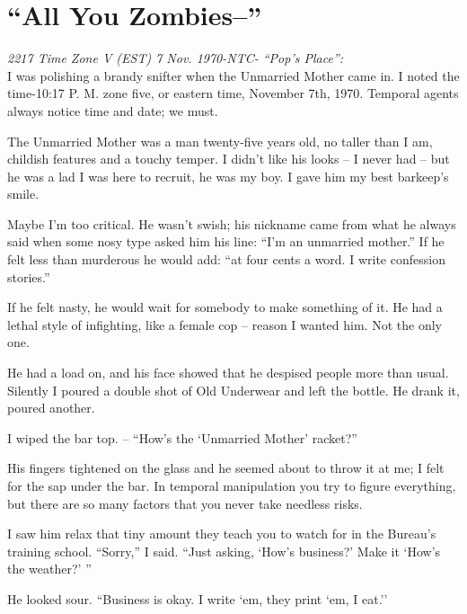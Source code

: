 
\chapter{``All You Zombies--''}

\emph{2217  Time Zone V (EST) 7 Nov. 1970-NTC- ``Pop's Place'':}\\
I was polishing a brandy snifter when the Unmarried Mother came
in. I noted the time-10:17 P. M. zone five, or  eastern  time,
November  7th,  1970.  Temporal  agents  always notice time and
date; we must.

The Unmarried Mother was a man twenty-five  years  old,
no  taller  than I am, childish features and a touchy temper. I
didn't like his looks -- I never had -- but he was a  lad  I  was
here  to  recruit,  he was my boy. I gave him my best barkeep's
smile.

Maybe I'm too critical. He wasn't swish;  his  nickname
came from what he always said when some nosy type asked him his
line:  ``I'm  an  unmarried  mother.''  If  he  felt less than
murderous he  would  add:  ``at  four  cents  a  word.  I  write
confession stories.''

If  he  felt  nasty, he would wait for somebody to make
something of it. He had a lethal style of  infighting,  like  a
female cop -- reason I wanted him. Not the only one.

He  had a load on, and his face showed that he despised
people more than usual. Silently I poured a double shot of  Old
Underwear and left the bottle. He drank it, poured another.

I  wiped  the  bar top. -- ``How's the `Unmarried Mother' racket?''

His fingers tightened on the glass and he seemed  about
to  throw  it  at  me;  I  felt  for  the sap under the bar. In
temporal manipulation you try to figure everything,  but  there
are so many factors that you never take needless risks.

I  saw  him  relax  that  tiny amount they teach you to
watch for in the Bureau's training school. ``Sorry,'' I  said.
``Just  asking, `How's business?' Make it `How's the weather?' ''

He looked sour. ``Business is okay. I write `em,  they
print `em, I eat.''

